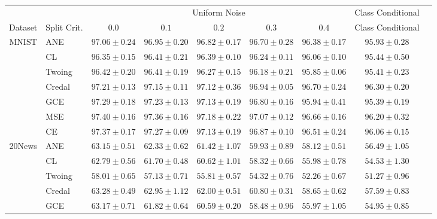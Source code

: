 \documentclass[letterpaper]{article} %
\begin{document}
\begin{table}[t] 
	\scriptsize 
	\centering 
	\begin{tabular}{clccccccc} 
&& \multicolumn{5}{c}{Uniform Noise} & Class Conditional \\ \cline{3-8} 
Dataset & Split Crit. & $0.0$ & $0.1$ & $0.2$ & $0.3$ & $0.4$ & Class Conditional  \\ \hline 
\multirow{7}{*}{MNIST}
 & ANE    & $97.06 \pm 0.24$ & $96.95 \pm 0.20$ & $96.82 \pm 0.17$ & $96.70 \pm 0.28$ & $96.38 \pm 0.17$ & $95.93 \pm 0.28$ \\ 
 & CL     & $96.35 \pm 0.15$ & $96.41 \pm 0.21$ & $96.39 \pm 0.10$ & $96.24 \pm 0.11$ & $96.06 \pm 0.10$ & $95.44 \pm 0.50$ \\ 
 & Twoing & $96.42 \pm 0.20$ & $96.41 \pm 0.19$ & $96.27 \pm 0.15$ & $96.18 \pm 0.21$ & $95.85 \pm 0.06$ & $95.41 \pm 0.23$ \\ 
 & Credal & $\mathbf{97.21 \pm 0.13}$ & $\mathbf{97.15 \pm 0.11}$ & $\mathbf{97.12 \pm 0.36}$ & $96.94 \pm 0.05$ & $\mathbf{96.70 \pm 0.24}$ & $\mathbf{96.30 \pm 0.20}$ \\ 
 & GCE    & $\mathbf{97.29 \pm 0.18}$ & $\mathbf{97.23 \pm 0.13}$ & $\mathbf{97.13 \pm 0.19}$ & $96.80 \pm 0.16$ & $95.94 \pm 0.41$ & $95.39 \pm 0.19$ \\ 
 & MSE    & $\mathbf{97.40 \pm 0.16}$ & $\mathbf{97.36 \pm 0.16}$ & $\mathbf{97.18 \pm 0.22}$ & $\mathbf{97.07 \pm 0.12}$ & $\mathbf{96.66 \pm 0.16}$ & $\mathbf{96.20 \pm 0.32}$ \\ 
 & CE     & $\mathbf{97.37 \pm 0.17}$ & $\mathbf{97.27 \pm 0.09}$ & $\mathbf{97.13 \pm 0.19}$ & $96.87 \pm 0.10$ & $\mathbf{96.51 \pm 0.24}$ & $\mathbf{96.06 \pm 0.15}$ \\ 
\hline
\multirow{7}{*}{20News}
 & ANE    & $\mathbf{63.15 \pm 0.51}$ & $\mathbf{62.33 \pm 0.62}$ & $\mathbf{61.42 \pm 1.07}$ & $\mathbf{59.93 \pm 0.89}$ & $\mathbf{58.12 \pm 0.51}$ & $\mathbf{56.49 \pm 1.05}$ \\ 
 & CL     & $\mathbf{62.79 \pm 0.56}$ & $61.70 \pm 0.48$ & $60.62 \pm 1.01$ & $58.32 \pm 0.66$ & $55.98 \pm 0.78$ & $54.53 \pm 1.30$ \\ 
 & Twoing & $58.01 \pm 0.65$ & $57.13 \pm 0.71$ & $55.81 \pm 0.57$ & $54.32 \pm 0.76$ & $52.26 \pm 0.67$ & $51.27 \pm 0.96$ \\ 
 & Credal & $\mathbf{63.28 \pm 0.49}$ & $\mathbf{62.95 \pm 1.12}$ & $\mathbf{62.00 \pm 0.51}$ & $\mathbf{60.80 \pm 0.31}$ & $\mathbf{58.65 \pm 0.62}$ & $\mathbf{57.59 \pm 0.83}$ \\ 
 & GCE    & $\mathbf{63.17 \pm 0.71}$ & $61.82 \pm 0.64$ & $60.59 \pm 0.20$ & $58.48 \pm 0.96$ & $55.97 \pm 1.05$ & $54.95 \pm 0.85$ \\ 

\end{tabular}
\end{table}
\end{document}
